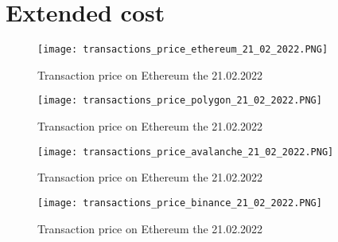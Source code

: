 \documentclass[a4paper,11pt,oneside]{report}
\begin{document}
\chapter{Extended cost}
\label{sec:appendix_b}

\begin{center}
\begin{figure}[h!] 
  \texttt{[image: transactions\_price\_ethereum\_21\_02\_2022.PNG]}
  \caption{Transaction price on Ethereum the 21.02.2022}
  \label{fig:transactions_price_ethereum_21_02_2022}
\end{figure}
\end{center}

\begin{center}
\begin{figure}[h!] 
  \texttt{[image: transactions\_price\_polygon\_21\_02\_2022.PNG]}
  \caption{Transaction price on Ethereum the 21.02.2022}
  \label{fig:transactions_price_polygon_21_02_2022}
\end{figure}
\end{center}

\begin{center}
\begin{figure}[h!] 
  \texttt{[image: transactions\_price\_avalanche\_21\_02\_2022.PNG]}
  \caption{Transaction price on Ethereum the 21.02.2022}
  \label{fig:transactions_price_avalanche_21_02_2022}
\end{figure}
\end{center}

\begin{center}
\begin{figure}[h!] 
  \texttt{[image: transactions\_price\_binance\_21\_02\_2022.PNG]}
  \caption{Transaction price on Ethereum the 21.02.2022}
  \label{fig:transactions_price_binance_21_02_2022}
\end{figure}
\end{center}
\end{document}
